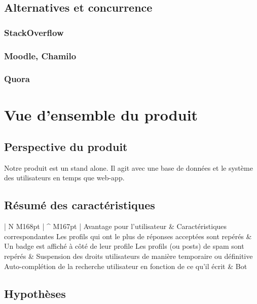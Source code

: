 \subsection{Alternatives et concurrence}
\subsubsection{StackOverflow}

\subsubsection{Moodle, Chamilo}

\subsubsection{Quora}

\section{Vue d'ensemble du produit}
\subsection{Perspective du produit}

Notre produit est un stand alone. Il agit avec une base de données et le système des utilisateurs en temps que web-app.

\subsection{Résumé des caractéristiques}
\begin{longtable}{| N M{168pt} | ^ M{167pt} |}
	\hline
	\rowstyle{\bfseries} Avantage pour l'utilisateur & Caractéristiques correspondantes \tabularnewline
	\hline
	\endhead
	\hline
	Les profils qui ont le plus de réponses acceptées sont repérés & Un badge est affiché à côté de leur profile \tabularnewline
	\hline
	Les profils (ou posts) de spam sont repérés & Suspension des droits utilisateurs de manière temporaire ou définitive \tabularnewline
	\hline
	Auto-complétion de la recherche utilisateur en fonction de ce qu'il écrit & Bot \tabularnewline
	\hline
\end{longtable}

\subsection{Hypothèses}

